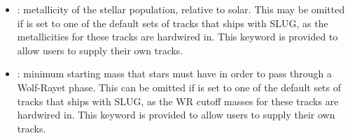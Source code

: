 \documentclass[letterpaper,10pt,english]{sphinxmanual}
\begin{document}
\begin{itemize}
\item {} 
: metallicity of the stellar population, relative to solar. This may be omitted if  is set to one of the default sets of tracks that ships with SLUG, as the metallicities for these tracks are hardwired in. This keyword is provided to allow users to supply their own tracks.

\item {} 
: minimum starting mass that stars must have in order to pass through a Wolf-Rayet phase. This can be omitted if  is set to one of the default sets of tracks that ships with SLUG, as the WR cutoff masses for these tracks are hardwired in. This keyword is provided to allow users to supply their own tracks.

\end{itemize}
\end{document}
